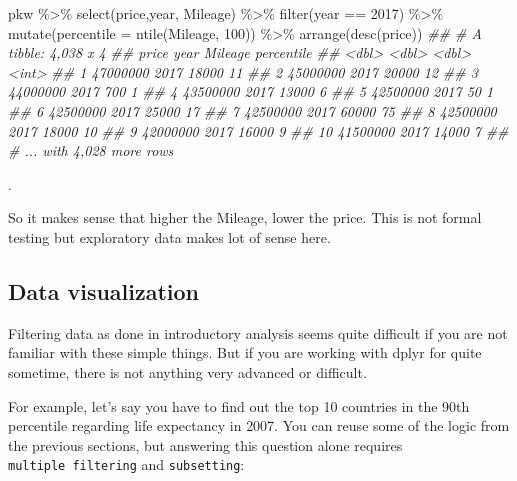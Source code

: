 \documentclass[
  letterpaper,
  DIV=11,
  numbers=noendperiod]{scrartcl}
\newenvironment{Shaded}{\begin{snugshade}}{\end{snugshade}}
\newcommand{\AttributeTok}[1]{\textcolor[rgb]{0.40,0.45,0.13}{#1}}
\newcommand{\DecValTok}[1]{\textcolor[rgb]{0.68,0.00,0.00}{#1}}
\newcommand{\DocumentationTok}[1]{\textcolor[rgb]{0.37,0.37,0.37}{\textit{#1}}}
\newcommand{\FunctionTok}[1]{\textcolor[rgb]{0.28,0.35,0.67}{#1}}
\newcommand{\NormalTok}[1]{\textcolor[rgb]{0.00,0.23,0.31}{#1}}
\newcommand{\SpecialCharTok}[1]{\textcolor[rgb]{0.37,0.37,0.37}{#1}}
\begin{document}
\begin{Shaded}
\begin{Highlighting}[]

\NormalTok{pkw }\SpecialCharTok{\%\textgreater{}\%} \FunctionTok{select}\NormalTok{(price,year, Mileage) }\SpecialCharTok{\%\textgreater{}\%} 
  \FunctionTok{filter}\NormalTok{(year }\SpecialCharTok{==} \DecValTok{2017}\NormalTok{) }\SpecialCharTok{\%\textgreater{}\%}
  \FunctionTok{mutate}\NormalTok{(}\AttributeTok{percentile =} \FunctionTok{ntile}\NormalTok{(Mileage, }\DecValTok{100}\NormalTok{)) }\SpecialCharTok{\%\textgreater{}\%}
  \FunctionTok{arrange}\NormalTok{(}\FunctionTok{desc}\NormalTok{(price))}
\DocumentationTok{\#\# \# A tibble: 4,038 x 4}
\DocumentationTok{\#\#       price  year Mileage percentile}
\DocumentationTok{\#\#       \textless{}dbl\textgreater{} \textless{}dbl\textgreater{}   \textless{}dbl\textgreater{}      \textless{}int\textgreater{}}
\DocumentationTok{\#\#  1 47000000  2017   18000         11}
\DocumentationTok{\#\#  2 45000000  2017   20000         12}
\DocumentationTok{\#\#  3 44000000  2017     700          1}
\DocumentationTok{\#\#  4 43500000  2017   13000          6}
\DocumentationTok{\#\#  5 42500000  2017      50          1}
\DocumentationTok{\#\#  6 42500000  2017   25000         17}
\DocumentationTok{\#\#  7 42500000  2017   60000         75}
\DocumentationTok{\#\#  8 42500000  2017   18000         10}
\DocumentationTok{\#\#  9 42000000  2017   16000          9}
\DocumentationTok{\#\# 10 41500000  2017   14000          7}
\DocumentationTok{\#\# \# ... with 4,028 more rows}
\end{Highlighting}
\end{Shaded}

.

So it makes sense that higher the Mileage, lower the price. This is not
formal testing but exploratory data makes lot of sense here.

\hypertarget{data-visualization}{%
\subsection{Data visualization}\label{data-visualization}}

Filtering data as done in introductory analysis seems quite difficult if
you are not familiar with these simple things. But if you are working
with dplyr for quite sometime, there is not anything very advanced or
difficult.

For example, let's say you have to find out the top 10 countries in the
90th percentile regarding life expectancy in 2007. You can reuse some of
the logic from the previous sections, but answering this question alone
requires \texttt{multiple\ filtering} and \texttt{subsetting}:
\end{document}
